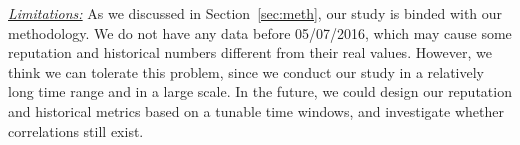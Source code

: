 {\textit{\underline{Limitations:}}}
As we discussed in Section~\ref{sec:meth}, our study is binded with our methodology.
We do not have any data before 05/07/2016, 
which may cause some reputation and historical numbers different from their real values. 
However, we think we can tolerate this problem, since we conduct our study in a relatively long time range and in a large scale. 
In the future, we could design our reputation and historical metrics based on a tunable time windows, 
and investigate whether correlations still exist.  